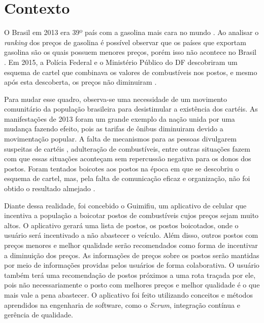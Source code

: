 \section{Contexto}

O Brasil em 2013 era 39º país com a gasolina mais cara no mundo \cite{oglobo}. Ao analisar o \textit{ranking} dos preços de gasolina é possível observar que os países que exportam gasolina são os quais possuem menores preços, porém isso não acontece no Brasil \cite{ranking-precos}. Em 2015, a Polícia Federal e o Ministério Público do DF descobriram um esquema de cartel que combinava os valores de combustíveis nos postos, e mesmo após esta descoberta, os preços não diminuiram \cite{correio-cartel}.

Para mudar esse quadro, observa-se uma necessidade de um movimento comunitário da população brasileira para desistimular a existência dos cartéis. As manifestações de 2013 foram um grande exemplo da nação unida por uma mudança fazendo efeito, pois as tarifas de ônibus diminuiram devido a movimentação popular. A falta de mecanismos para as pessoas divulgarem suspeitas de cartéis \cite{manifestacoes-2013}, adulteração de combustíveis, entre outras situações fazem com que essas situações aconteçam sem repercussão negativa para os donos dos postos. Foram tentados boicotes aos postos na época em que se descobriu o esquema de cartel, mas, pela falta de comunicação eficaz e organização, não foi obtido o resultado almejado \cite{boicotes-2016}.

Diante dessa realidade, foi concebido o Guimifiu, um aplicativo de celular que incentiva a população a boicotar postos de combustíveis cujos preços sejam muito altos. O aplicativo gerará uma lista de postos, os postos boicotados, onde o usuário será incentivado a não abastecer o veículo. Além disso, outros postos com preços menores e melhor qualidade serão recomendados como forma de incentivar a diminuição dos preços. As informações de preços sobre os postos serão mantidas por meio de informações providas pelos usuários de forma colaborativa. O usuário também terá uma recomendação de postos próximos a uma rota traçada por ele, pois não necessariamente o posto com melhores preços e melhor qualidade é o que mais vale a pena abastecer. O aplicativo foi feito utilizando conceitos e métodos aprendidos na engenharia de software, como o \textit{Scrum}, integração contínua e gerência de qualidade.
